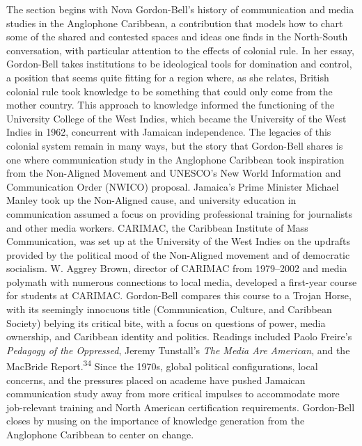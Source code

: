 \documentclass{tufte-handout}
\begin{document}
The section begins with Nova Gordon-Bell's history of communication and
media studies in the Anglophone Caribbean, a contribution that models
how to chart some of the shared and contested spaces and ideas one finds
in the North-South conversation, with particular attention to the
effects of colonial rule. In her essay, Gordon-Bell takes institutions
to be ideological tools for domination and control, a position that
seems quite fitting for a region where, as she relates, British colonial
rule took knowledge to be something that could only come from the mother
country. This approach to knowledge informed the functioning of the
University College of the West Indies, which became the University of
the West Indies in 1962, concurrent with Jamaican independence. The
legacies of this colonial system remain in many ways, but the story that
Gordon-Bell shares is one where communication study in the Anglophone
Caribbean took inspiration from the Non-Aligned Movement and UNESCO's
New World Information and Communication Order (NWICO) proposal.
Jamaica's Prime Minister Michael Manley took up the Non-Aligned cause,
and university education in communication assumed a focus on providing
professional training for journalists and other media workers. CARIMAC,
the Caribbean Institute of Mass Communication, was set up at the
University of the West Indies on the updrafts provided by the political
mood of the Non-Aligned movement and of democratic socialism. W. Aggrey
Brown, director of CARIMAC from 1979--2002 and media polymath with
numerous connections to local media, developed a first-year course for
students at CARIMAC. Gordon-Bell compares this course to a Trojan Horse,
with its seemingly innocuous title (Communication, Culture, and
Caribbean Society) belying its critical bite, with a focus on questions
of power, media ownership, and Caribbean identity and politics. Readings
included Paolo Freire's \emph{Pedagogy of the Oppressed}, Jeremy
Tunstall's \emph{The Media Are American}, and the MacBride
Report.\textsuperscript{34} Since the 1970s, global political configurations,
local concerns, and the pressures placed on academe have pushed Jamaican
communication study away from more critical impulses to accommodate more
job-relevant training and North American certification requirements.
Gordon-Bell closes by musing on the importance of knowledge generation
from the Anglophone Caribbean to center on change.
\end{document}

